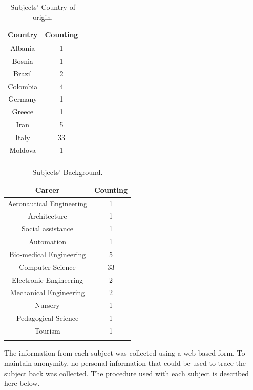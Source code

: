 \begin{table}[h]
\centering
\caption{Subjects' Country of origin.}
\label{table:country}
\begin{tabular}{|c|c|}
\hline
\textbf{Country} & \textbf{Counting} \\
\hline
Albania & 1 \\
\hline
Bosnia & 1 \\
\hline
Brazil & 2 \\
\hline
Colombia & 4 \\
\hline
Germany & 1 \\
\hline
Greece & 1 \\
\hline
Iran & 5 \\
\hline
Italy & 33 \\
\hline
Moldova & 1 \\
\hline 
\multicolumn{2}{c}{}
\end{tabular} 
\end{table}

\begin{table}[h]
\centering
\caption{Subjects' Background.}
\label{table:career}
\begin{tabular}{|c|c|}
\hline
\textbf{Career} & \textbf{Counting}\\
\hline
Aeronautical Engineering & 1 \\
\hline
Architecture & 1 \\
\hline
Social assistance & 1 \\
\hline
Automation & 1 \\
\hline
Bio-medical Engineering & 5 \\
\hline
Computer Science & 33 \\
\hline
Electronic Engineering & 2 \\
\hline
Mechanical Engineering & 2 \\
\hline
Nursery & 1 \\
\hline
Pedagogical Science & 1 \\
\hline
Tourism & 1 \\
\hline
\multicolumn{2}{c}{}
\end{tabular} 
\end{table}

The information from each subject was collected using a web-based form. To maintain anonymity, no personal information that could be used to trace the subject back was collected. The procedure used with each subject is described here below.

